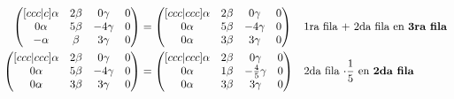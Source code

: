 \documentclass[letterpaper]{article}
\renewcommand{\*}{\cdot}
\theoremstyle{definition}
\begin{document}
		\begin{align*}
		\begin{pmatrix}[ccc|c]
		\alpha & 2\beta & 0\gamma & 0\\
		0\alpha & 5\beta & -4\gamma& 0\\
		-\alpha & \beta & 3\gamma & 0
		\end{pmatrix} &= \begin{pmatrix}[ccc|ccc]
		\alpha & 2\beta & 0\gamma & 0\\
		0\alpha & 5\beta & -4\gamma& 0\\
		0\alpha & 3\beta & 3\gamma & 0
		\end{pmatrix} && \text{1ra fila + 2da fila en \textbf{3ra fila}} \\
		\begin{pmatrix}[ccc|ccc]
		\alpha & 2\beta & 0\gamma & 0\\
		0\alpha & 5\beta & -4\gamma& 0\\
		0\alpha & 3\beta & 3\gamma & 0
		\end{pmatrix} &= \begin{pmatrix}[ccc|ccc]
		\alpha & 2\beta & 0\gamma & 0\\
		0\alpha & 1\beta & -\frac{4}{5}\gamma& 0\\
		0\alpha & 3\beta & 3\gamma & 0
		\end{pmatrix} && \text{2da fila $ \* \frac{1}{5} $ en \textbf{2da fila}}\\
		\end{align*}
\end{document}
